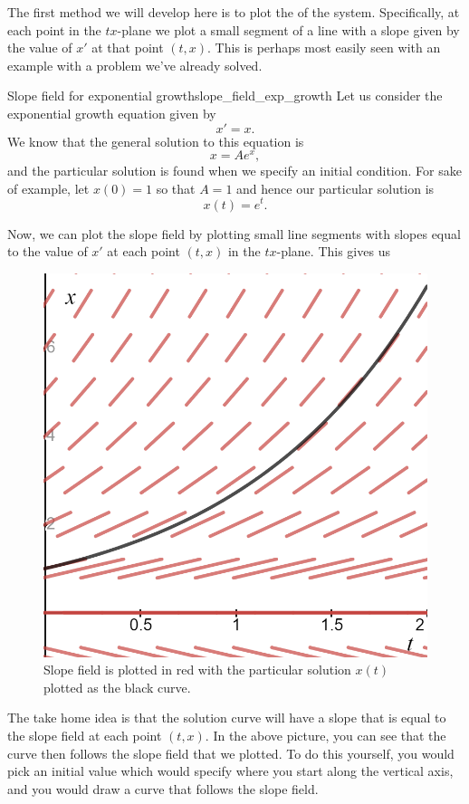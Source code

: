             
            The first method we will develop here is to plot the   of the system.  Specifically, at each point in the $tx$-plane we plot a small segment of a line with a slope given by the value of $x'$ at that point $(t,x)$.  This is perhaps most easily seen with an example with a problem we've already solved.
            
            \begin{ex}{Slope field for exponential growth}{slope_field_exp_growth}
                Let us consider the exponential growth equation given by
                \[
                x'=x.
                \]
                We know that the general solution to this equation is
                \[
                x=Ae^x,
                \]
                and the particular solution is found when we specify an initial condition. For sake of example, let $x(0)=1$ so that $A=1$ and hence our particular solution is
                \[
                x(t)=e^t.
                \]
                
                Now, we can plot the slope field by plotting small line segments with slopes equal to the value of $x'$ at each point $(t,x)$ in the $tx$-plane. This gives us
                \begin{figure}[H]
                    \centering
                    \includegraphics[width=.6\textwidth]{Figures_Part_1/slope_field_exp_growth.png}
                    \caption{Slope field is plotted in red with the particular solution $x(t)$ plotted as the black curve.}
                \end{figure}
                
                The take home idea is that the solution curve will have a slope that is equal to the slope field at each point $(t,x)$. In the above picture, you can see that the curve then follows the slope field that we plotted. To do this yourself, you would pick an initial value which would specify where you start along the vertical axis, and you would draw a curve that follows the slope field.
            \end{ex}
            
